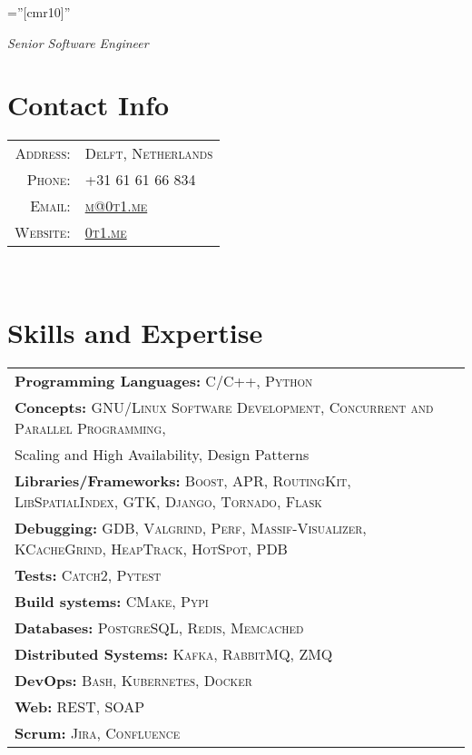\documentclass[a4paper,11pt]{article}
\begin{document}
\pagestyle{empty}    %
\font\fb=''[cmr10]'' %

\par {\bigskip \emph{Senior Software Engineer} \par}

\section{Contact Info}
\begin{tabular}{rl}

    \textsc{Address:}     & \textsc{Delft, Netherlands}\\
    \textsc{Phone:}       & \textsc{+31 61 61 66 834}\\
    \textsc{Email:}       & \textsc{\href{mailto:m@0t1.me}{m@0t1.me}}\\
    \textsc{Website:}     & \textsc{\href{https://0t1.me/}{0t1.me}}\\

\end{tabular}\\

\section{Skills and Expertise}
\begin{tabular}{lr}

    \textbf{Programming Languages:} \textsc{C/C++, Python}\\
    \textbf{Concepts:} \textsc{GNU/Linux Software Development, Concurrent and Parallel Programming,}\\
    {Scaling and High Availability, Design Patterns}\\
    \textbf{Libraries/Frameworks:} \textsc{Boost, APR, RoutingKit, LibSpatialIndex, GTK, Django, Tornado, Flask}\\
    \textbf{Debugging:} \textsc{GDB, Valgrind, Perf, Massif-Visualizer, KCacheGrind, HeapTrack, HotSpot, PDB}\\
    \textbf{Tests:} \textsc{Catch2, Pytest}\\
    \textbf{Build systems:} \textsc{CMake, Pypi}\\
    \textbf{Databases:} \textsc{PostgreSQL, Redis, Memcached}\\
    \textbf{Distributed Systems:} \textsc{Kafka, RabbitMQ, ZMQ}\\
    \textbf{DevOps:} \textsc{Bash, Kubernetes, Docker}\\
    \textbf{Web:} \textsc{REST, SOAP}\\
    \textbf{Scrum:} \textsc{Jira, Confluence}

\end{tabular}\\
\end{document}
